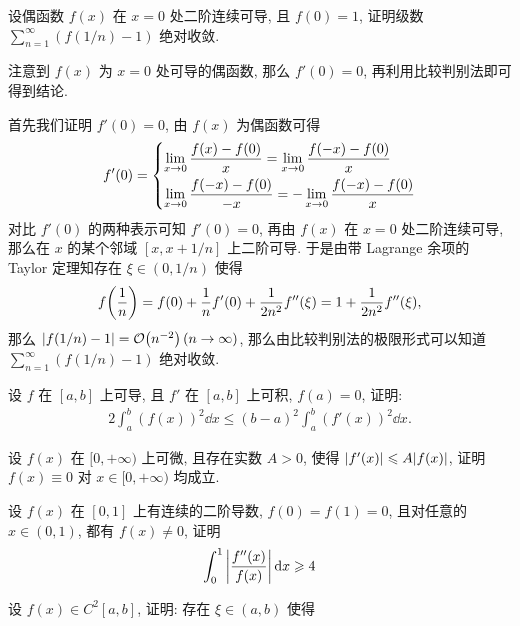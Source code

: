 \documentclass{ctexart}
\begin{document}
\begin{exercise}[series=exer]
    \item 设偶函数 $ f(x) $ 在 $ x = 0 $ 处二阶连续可导, 且 $ f(0) = 1 $, 证明级数 $ \sum_{n = 1}^{\infty} (f(1/n) - 1) $ 绝对收敛.
    \begin{hint}
        注意到 $ f(x) $ 为 $ x = 0 $ 处可导的偶函数, 那么 $ f'(0) = 0 $, 再利用比较判别法即可得到结论.
    \end{hint}
    \begin{answer}
        首先我们证明 $ f'(0) = 0 $, 由 $ f(x) $ 为偶函数可得
        \begin{align*}
            f'(0) = \begin{dcases}
                \lim_{x \to 0}\frac{f(x) - f(0)}{x} = \lim_{x \to 0}\frac{f(-x) - f(0)}{x} \\
                \lim_{x \to 0} \frac{f(-x) - f(0)}{-x} = -\lim_{x \to 0}\frac{f(-x) - f(0)}{x}
            \end{dcases}
        \end{align*}
        对比 $ f'(0) $ 的两种表示可知 $ f'(0) = 0 $, 再由 $ f(x) $ 在 $ x = 0 $ 处二阶连续可导, 那么在 $ x $ 的某个邻域 $ [x, x+1/n] $ 上二阶可导. 于是由带 Lagrange 余项的 Taylor 定理知存在 $ \xi \in (0, 1/n) $ 使得
        \begin{align*}
            f\qty(\frac{1}{n}) = f(0) + \frac{1}{n}f'(0) + \frac{1}{2n^{2}}f''(\xi) = 1 + \frac{1}{2n^{2}}f''(\xi), 
        \end{align*}
        那么 $ \abs{f(1/n) - 1} = \order{n^{-2}}\,(n \to \infty) $, 那么由比较判别法的极限形式可以知道 $ \sum_{n = 1}^{\infty} (f(1/n) - 1) $ 绝对收敛.
    \end{answer}
    \item 设 $ f $ 在 $ [a, b] $ 上可导, 且 $ f' $ 在 $ [a, b] $ 上可积, $ f(a) = 0 $, 证明:
    \begin{align*}
        2\int_{a}^{b}(f(x))^{2} \dd{x} \le (b-a)^{2} \int_{a}^{b} (f'(x))^{2} \dd{x}.
    \end{align*}
    \item 设 $ f(x) $ 在 $ [0, +\infty) $ 上可微, 且存在实数 $ A > 0 $, 使得 $ \abs{f'(x)} \leqslant A\abs{f(x)} $, 证明 $ f(x) \equiv 0 $ 对 $ x \in [0, +\infty) $ 均成立.
    \item 设 $ f(x) $ 在 $ [0, 1] $ 上有连续的二阶导数, $ f(0) = f(1) = 0 $, 且对任意的 $ x \in (0, 1) $, 都有 $ f(x) \ne 0 $, 证明
    \begin{align*}
        \int_{0}^{1} \abs{f''(x)\over f(x)} \dd{x} \geqslant 4
    \end{align*}
    \item 设 $ f(x) \in C^{2}[a, b] $, 证明: 存在 $ \xi \in (a, b) $ 使得

\end{exercise}
\end{document}
